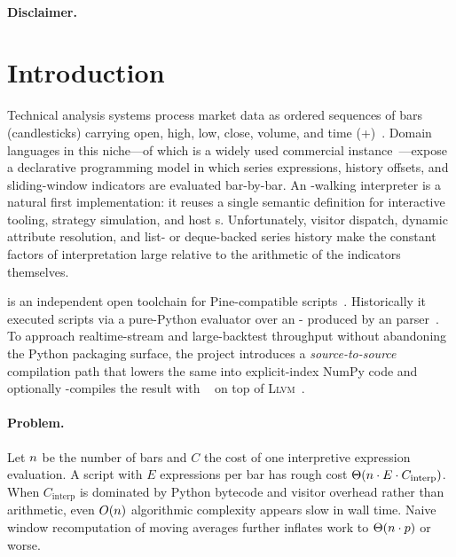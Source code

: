 \documentclass[11pt,a4paper]{article}
\newcommand{\llvm}{\textsc{Llvm}}
\begin{document}
\paragraph{Disclaimer.}
\trademarknote{}

\section{Introduction}
\label{sec:intro}

Technical analysis systems process market data as ordered sequences of bars
(candlesticks) carrying open, high, low, close, volume, and time
(\ohlcv{}+)~\citep{murphy1999technical,tsay2010analysis}. Domain
languages in this niche---of which \pine{} is a widely used commercial
instance~\citep{tradingview-pine}---expose a declarative programming model
in which series expressions, history offsets, and sliding-window indicators
are evaluated bar-by-bar. An \ast{}-walking interpreter is a natural first
implementation: it reuses a single semantic definition for interactive
tooling, strategy simulation, and host \api{}s. Unfortunately, visitor
dispatch, dynamic attribute resolution, and list- or deque-backed series
history make the constant factors of interpretation large relative to the
arithmetic of the indicators themselves.

\pyne{} is an independent open toolchain for Pine-compatible
scripts~\citep{pynescript2026,hoox2026}. Historically it executed scripts via
a pure-Python evaluator over an \asdl{}-\ast{} produced by an \antlr{}
parser~\citep{parr2013antlr,wang1997asdl}. To approach realtime-stream and
large-backtest throughput without abandoning the Python packaging surface, the
project introduces a \emph{source-to-source} compilation path that lowers the
same \ast{} into explicit-index NumPy code and optionally \jit{}-compiles the
result with \numba{}~\citep{lam2015numba} on top of \llvm{}~\citep{lattner2004llvm}.

\paragraph{Problem.}
Let $n$ be the number of bars and $C$ the cost of one interpretive
expression evaluation. A script with $E$ expressions per bar has rough cost
$\Theta(n\cdot E\cdot C_{\mathrm{interp}})$. When $C_{\mathrm{interp}}$ is
dominated by Python bytecode and visitor overhead rather than arithmetic,
even $O(n)$ algorithmic complexity appears slow in wall time. Naive
window recomputation of moving averages further inflates work to
$\Theta(n\cdot p)$ or worse.
\end{document}
